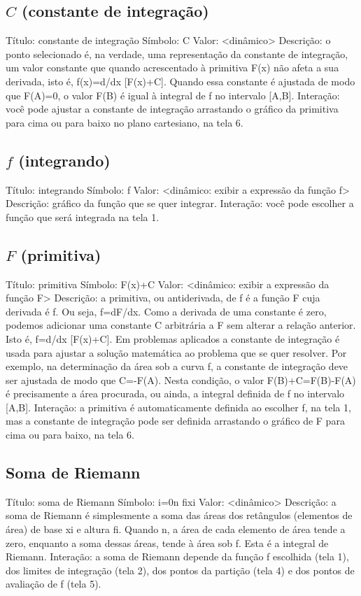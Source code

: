 \documentclass[a4paper,10pt]{scrartcl}
\begin{document}
  \subsection*{$C$ (constante de integração)}
	Título: constante de integração
	Símbolo: C
	Valor: <dinâmico>
	Descrição: o ponto selecionado é, na verdade, uma representação da constante de integração, um valor constante que quando acrescentado à primitiva F(x) não afeta a sua derivada, isto é, f(x)=d/dx [F(x)+C]. Quando essa constante é ajustada de modo que F(A)=0, o valor F(B) é igual à integral de f no intervalo [A,B].
	Interação: você pode ajustar a constante de integração arrastando o gráfico da primitiva para cima ou para baixo no plano cartesiano, na tela 6.

  \subsection*{$f$ (integrando)}
	Título: integrando
	Símbolo: f
	Valor: <dinâmico: exibir a expressão da função f>
	Descrição: gráfico da função que se quer integrar.
	Interação: você pode escolher a função que será integrada na tela 1.

  \subsection*{$F$ (primitiva)}
	Título: primitiva
	Símbolo: F(x)+C
	Valor: <dinâmico: exibir a expressão da função F>
	Descrição: a primitiva, ou antiderivada, de f é a função F cuja derivada é f. Ou seja, f=dF/dx. Como a derivada de uma constante é zero, podemos adicionar uma constante C arbitrária a F sem alterar a relação anterior. Isto é, f=d/dx [F(x)+C]. Em problemas aplicados a constante de integração é usada para ajustar a solução matemática ao problema que se quer resolver. Por exemplo, na determinação da área sob a curva f, a constante de integração deve ser ajustada de modo que C=-F(A). Nesta condição, o valor F(B)+C=F(B)-F(A) é precisamente a área procurada, ou ainda, a integral definida de f no intervalo [A,B].
	Interação: a primitiva é automaticamente definida ao escolher f, na tela 1, mas a constante de integração pode ser definida arrastando o gráfico de F para cima ou para baixo, na tela 6.

  \subsection*{Soma de Riemann}
	Título: soma de Riemann
	Símbolo: i=0n fixi
	Valor: <dinâmico>
	Descrição: a soma de Riemann é simplesmente a soma das áreas dos retângulos (elementos de área) de base xi e altura fi. Quando n, a área de cada elemento de área tende a zero, enquanto a soma dessas áreas, tende à área sob f. Esta é a integral de Riemann.
	Interação: a soma de Riemann depende da função f escolhida (tela 1), dos limites de integração (tela 2), dos pontos da partição (tela 4) e dos pontos de avaliação de f (tela 5).
\end{document}
